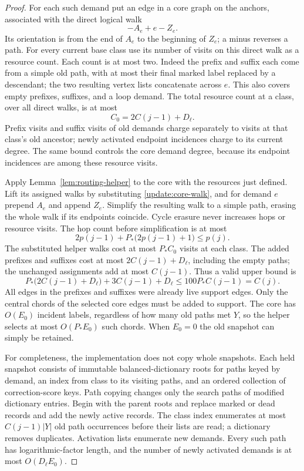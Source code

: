\begin{proof}
For each such demand put an edge in a core graph on the anchors,
associated with the direct logical walk
\begin{equation}
                 -A_e+e-Z_e.
 \label{update:core-walk}
\end{equation}
Its orientation is from the end of $A_e$ to the beginning of $Z_e$;
a minus reverses a path.  For every current base class use its number
of visits on this direct walk as a resource count.  Each count is at
most two.  Indeed the prefix and suffix each come from a simple old
path, with at most their final marked label replaced by a descendant;
the two resulting vertex lists concatenate across $e$.  This also
covers empty prefixes, suffixes, and a loop demand.  The total resource
count at a class, over all direct walks, is at most
\begin{equation}
                  C_0=2C(j-1)+D_\ell.
 \label{update:core-resource}
\end{equation}
Prefix visits and suffix visits of old demands charge separately to
visits at that class's old ancestor; newly activated endpoint
incidences charge to its current degree.  The same bound controls
the core demand degree, because its endpoint incidences are among
these resource visits.

Apply Lemma~\ref{lem:routing-helper} to the core with the resources
just defined.  Lift its assigned walks by substituting
\eqref{update:core-walk}, and for demand $e$ prepend $A_e$ and append
$Z_e$.  Simplify the resulting walk to a simple path, erasing the whole
walk if its endpoints coincide.  Cycle erasure never increases hops
or resource visits.  The hop count before simplification is at most
\begin{equation}
 2p(j-1)+P_*\bigl(2p(j-1)+1\bigr)\le p(j).
 \label{update:hop-induction}
\end{equation}
The substituted helper walks cost at most $P_*C_0$ visits at each
class.  The added prefixes and suffixes cost at most
$2C(j-1)+D_\ell$, including the empty paths; the unchanged assignments
add at most $C(j-1)$.  Thus a valid upper bound is
\[
 P_*\bigl(2C(j-1)+D_\ell\bigr)+3C(j-1)+D_\ell
 \le100P_*C(j-1)=C(j).
\]
All edges in the prefixes and suffixes were already live support
edges.  Only the central chords of the selected core edges must be
added to support.  The core has $O(E_0)$ incident labels, regardless
of how many old paths met $Y$, so the helper selects at most
$O(P_*E_0)$ such chords.  When $E_0=0$ the old snapshot can simply be
retained.

For completeness, the implementation does not copy whole snapshots.
Each held snapshot consists of immutable balanced-dictionary roots
for paths keyed by demand, an index from class to its visiting paths,
and an ordered collection of correction-score keys.  Path copying
changes only the search paths of modified dictionary entries.  Begin
with the parent roots and replace marked or dead records and add the
newly active records.  The class index enumerates at most
$C(j-1)|Y|$ old path occurrences before their lists are read; a
dictionary removes duplicates.  Activation lists enumerate new
demands.  Every such path has logarithmic-factor length, and the
number of newly activated demands is at most $O(D_\ell E_0)$.


\end{proof}
